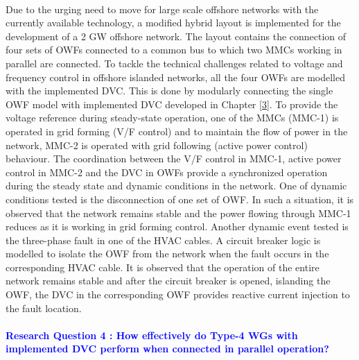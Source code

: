 \paragraph{} Due to the urging need to move for large scale offshore networks with the currently available technology, a modified hybrid layout is implemented for the development of a 2 GW offshore network. The layout contains the connection of four sets of \gls{OWF}s connected to a common bus to which two \gls{MMC}s working in parallel are connected. To tackle the technical challenges related to voltage and frequency control in offshore islanded networks, all the four \gls{OWF}s are modelled with the implemented \gls{DVC}. This is done by modularly connecting the single \gls{OWF} model with implemented \gls{DVC} developed in Chapter \ref{3}. To provide the voltage reference during steady-state operation, one of the \gls{MMC}s (\gls{MMC}-1) is operated in grid forming (V/F control) and to maintain the flow of power in the network, \gls{MMC}-2 is operated with grid following (active power control) behaviour. %
The coordination between the V/F control in \gls{MMC}-1, active power control in \gls{MMC}-2 and the \gls{DVC} in \gls{OWF}s provide a synchronized operation during the steady state and dynamic conditions in the network. One of dynamic conditions tested is the disconnection of one set of \gls{OWF}. In such a situation, it is observed that the network remains stable and the power flowing through \gls{MMC}-1 reduces as it is working in grid forming control. Another dynamic event tested is the three-phase fault in one of the \gls{HVAC} cables. A circuit breaker logic is modelled to isolate the \gls{OWF} from the network when the fault occurs in the corresponding \gls{HVAC} cable. It is observed that the operation of the entire network remains stable and after the circuit breaker is opened, islanding the \gls{OWF}, the \gls{DVC} in the corresponding \gls{OWF} provides reactive current injection to the fault location.

\paragraph{\textcolor{blue}{Research Question 4 : How effectively do Type-4 \gls{WG}s with implemented \gls{DVC} perform when connected in parallel operation?}}

